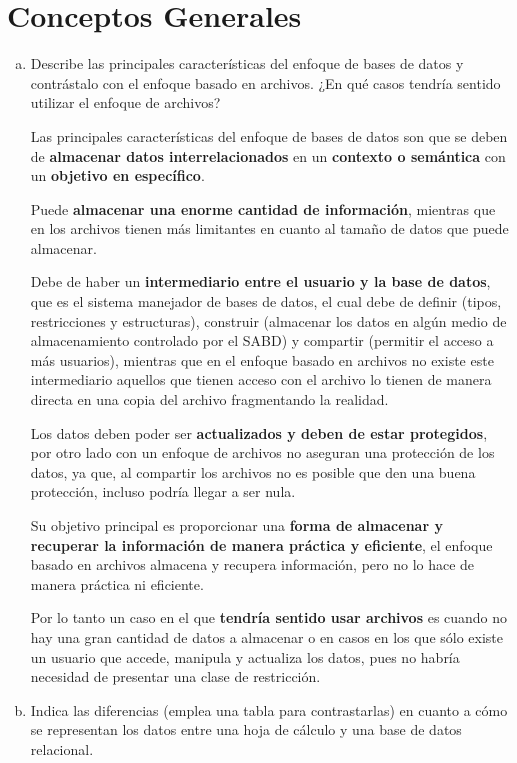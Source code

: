 \documentclass[12pt]{article}
\begin{document}
\newpage
\section{Conceptos Generales}
\begin{enumerate}[a.]
\item Describe las principales características del enfoque de bases de datos y contrástalo con el enfoque basado en archivos. ¿En qué casos tendría sentido utilizar el enfoque de archivos?


Las principales características del enfoque de bases de datos son que se deben de \textbf{almacenar datos interrelacionados} en un 
\textbf{contexto o semántica} con un \textbf{objetivo en específico}.


Puede \textbf{almacenar una enorme cantidad de información}, mientras que en los archivos tienen más limitantes en cuanto al tamaño de datos que puede almacenar.
    

Debe de haber un \textbf{intermediario entre el usuario y la base de datos}, que es el sistema manejador de bases de datos, el cual debe de definir (tipos, restricciones y estructuras), construir (almacenar los datos en algún medio de almacenamiento controlado por el SABD) y compartir (permitir el acceso a más usuarios),  mientras que en el enfoque basado en archivos no existe este intermediario aquellos que tienen acceso con el archivo lo tienen de manera directa en una copia del archivo fragmentando la realidad.
    

Los datos deben poder ser \textbf{actualizados y deben de estar protegidos}, por otro lado con un enfoque de archivos no aseguran una
protección de los datos, ya que, al compartir los archivos no es posible que den una buena protección, incluso podría llegar a ser nula. 
    

Su objetivo principal es proporcionar una \textbf{forma de almacenar y recuperar la información de manera práctica y eficiente}, el enfoque basado en archivos almacena y recupera información, pero no lo hace de manera práctica ni eficiente.
    
Por lo tanto un caso en el que \textbf{tendría sentido usar archivos} es cuando no hay una gran cantidad de datos a almacenar o en casos en los que sólo existe un usuario que accede, manipula y actualiza
los datos, pues no habría necesidad de presentar una clase de restricción.

\item Indica las diferencias (emplea una tabla para contrastarlas) en cuanto a cómo se representan los datos entre una hoja de cálculo y una base de datos relacional.


\end{enumerate}
\end{document}
